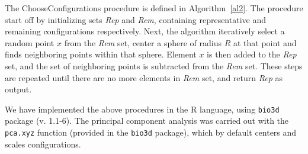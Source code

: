 \documentclass[a4paper,11pt,twoside]{book}%
\begin{document}
\begin{appendices}
The ChooseConfigurations procedure is defined in Algorithm~\ref{al2}.
The procedure start off by initializing sets \emph{Rep} and \emph{Rem}, containing representative and remaining configurations respectively.
Next, the algorithm iteratively select a random point $x$ from the \emph{Rem} set, center a sphere of radius $R$ at that point and finds neighboring points within that sphere.
Element $x$ is then added to the \emph{Rep} set, and the set of neighboring points is subtracted from the \emph{Rem} set.
These steps are repeated until there are no more elements in \emph{Rem} set, and return \emph{Rep} as output.

\begin{algorithm}
\DontPrintSemicolon
\SetAlgoLined
{}
\label{al2}

\end{algorithm}

We have implemented the above procedures in the R language, using \texttt{bio3d} package (v. 1.1-6).
The principal component analysis was carried out with the \texttt{pca.xyz} function (provided in the \texttt{bio3d} package), which by default centers and scales configurations.



\end{appendices}
\end{document}
